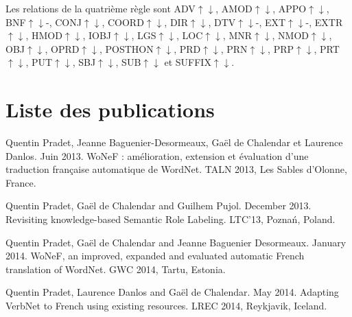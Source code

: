 \documentclass[oneside,parskip,draft]{scrbook}
\begin{document}
Les relations de la quatrième règle sont ADV$\uparrow\downarrow$,
AMOD$\uparrow\downarrow$, APPO$\uparrow\downarrow$, BNF$\uparrow\downarrow$-,
CONJ$\uparrow\downarrow$, COORD$\uparrow\downarrow$, DIR$\uparrow\downarrow$,
DTV$\uparrow\downarrow$-, EXT$\uparrow\downarrow$-, EXTR$\uparrow\downarrow$,
HMOD$\uparrow\downarrow$, IOBJ$\uparrow\downarrow$, LGS$\uparrow\downarrow$,
LOC$\uparrow\downarrow$, MNR$\uparrow\downarrow$, NMOD$\uparrow\downarrow$,
OBJ$\uparrow\downarrow$, OPRD$\uparrow\downarrow$, POSTHON$\uparrow\downarrow$,
PRD$\uparrow\downarrow$, PRN$\uparrow\downarrow$, PRP$\uparrow\downarrow$,
PRT$\uparrow\downarrow$, PUT$\uparrow\downarrow$, SBJ$\uparrow\downarrow$,
SUB$\uparrow\downarrow$ et SUFFIX$\uparrow\downarrow$.

\chapter{Liste des publications}

Quentin Pradet, Jeanne Baguenier-Desormeaux, Gaël de Chalendar et Laurence Danlos. Juin 2013. WoNeF : amélioration, extension et évaluation d’une traduction française automatique de WordNet. TALN 2013, Les Sables d'Olonne, France.

Quentin Pradet, Gaël de Chalendar and Guilhem Pujol. December 2013. Revisiting knowledge-based Semantic Role Labeling. LTC'13, Poznań, Poland.

Quentin Pradet, Gaël de Chalendar and Jeanne Baguenier Desormeaux. January 2014. WoNeF, an improved, expanded and evaluated automatic French translation of WordNet. GWC 2014, Tartu, Estonia.

Quentin Pradet, Laurence Danlos and Gaël de Chalendar. May 2014. Adapting VerbNet to French using existing resources. LREC 2014, Reykjavik, Iceland.

\printglossary
\end{document}
